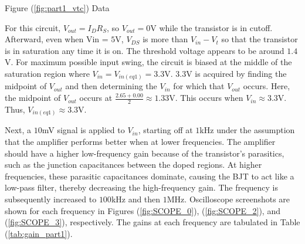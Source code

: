 \FloatBarrier

\begin{table}[h!]
	\centering
	\caption{Figure (\ref{fig:part1_vtc}) Data}
	\label{tab:part1_vtc}
\end{table}

\FloatBarrier

For this circuit, $V_{out} = I_{D}R_{S}$, so $V_{out} = 0$\si{\volt} while the transistor is in cutoff. Afterward, even when Vin = $5$\si{\volt}, $V_{DS}$ is more than $V_{in} - V_{t}$ so that the transistor is in saturation any time it is on.
The threshold voltage appears to be around $1.4$\si{\volt}.
For maximum possible input swing, the circuit is biased at the middle of the saturation region where $V_{in} = V_{in(eq1)} = 3.3$\si{\volt}.
$3.3$\si{\volt} is acquired by finding the midpoint of $V_{out}$ and then determining the $V_{in}$ for which that $V_{out}$ occurs.
Here, the midpoint of $V_{out}$ occurs at $\frac{2.65 + 0.00}{2} \approx 1.33$\si{\volt}.
This occurs when $V_{in} \approx 3.3$\si{\volt}.
Thus, $V_{in(eq1)} \approx 3.3$\si{\volt}.

Next, a $10$\si{\milli\volt} signal is applied to $V_{in}$, starting off at $1$\si{\kilo\hertz} under the assumption that the amplifier performs better when at lower frequencies. The amplifier should have a higher low-frequency gain because of the transistor's parasitics, such as the junction capacitances between the doped regions. At higher frequencies, these parasitic capacitances dominate, causing the BJT to act like a low-pass filter, thereby decreasing the high-frequency gain.
The frequency is subsequently increased to $100$\si{\kilo\hertz} and then $1$\si{\mega\hertz}. Oscilloscope screenshots are shown for each frequency in Figures (\ref{fig:SCOPE_0}), (\ref{fig:SCOPE_2}), and (\ref{fig:SCOPE_3}), respectively.
The gains at each frequency are tabulated in Table (\ref{tab:gain_part1}).

\FloatBarrier

